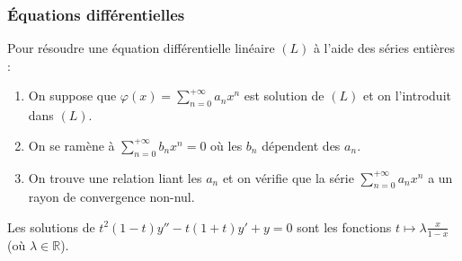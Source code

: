 	\subsubsection{Équations différentielles}
	
	
	\begin{proposition}
		Pour résoudre une équation différentielle linéaire $(L)$ à l'aide des séries entières :
		\begin{enumerate}
			\item On suppose que $\varphi(x) = \sum_{n=0}^{+\infty} a_n x^n$ est solution de $(L)$ et on l'introduit dans $(L)$.
			\item On se ramène à $\sum_{n=0}^{+\infty} b_nx^n = 0$ où les $b_n$ dépendent des $a_n$.
			\item On trouve une relation liant les $a_n$ et on vérifie que la série $\sum_{n=0}^{+\infty} a_n x^n$ a un rayon de convergence non-nul.
		\end{enumerate}
	\end{proposition}
	
	
	\begin{example}
		Les solutions de $t^2 (1-t) y'' - t (1+t) y' + y = 0$ sont les fonctions $t \mapsto \lambda \frac{x}{1-x}$ (où $\lambda \in \mathbb{R}$).
	\end{example}
